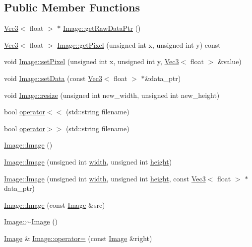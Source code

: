 \subsection*{Public Member Functions}
\begin{DoxyCompactItemize}
\item 
\hyperlink{classmath_1_1_vec3}{Vec3}$<$ float $>$ $\ast$ \hyperlink{classmath_1_1_image_a11850e9ecae1cced03a8ca2ad9469616}{Image\+::get\+Raw\+Data\+Ptr} ()
\item 
\hyperlink{classmath_1_1_vec3}{Vec3}$<$ float $>$ \hyperlink{classmath_1_1_image_ac3df85cc8f60c6f0b2d3de123fa9cf96}{Image\+::get\+Pixel} (unsigned int x, unsigned int y) const
\item 
void \hyperlink{classmath_1_1_image_aa2b37a157ae5f1711b7eaf15b3f6c96a}{Image\+::set\+Pixel} (unsigned int x, unsigned int y, \hyperlink{classmath_1_1_vec3}{Vec3}$<$ float $>$ \&value)
\item 
void \hyperlink{classmath_1_1_image_a6078dd91d77a6753e774466e61afd6f6}{Image\+::set\+Data} (const \hyperlink{classmath_1_1_vec3}{Vec3}$<$ float $>$ $\ast$\&data\+\_\+ptr)
\item 
void \hyperlink{classmath_1_1_image_a3dc725fbfeac02c4687bb7c7e4a184fd}{Image\+::resize} (unsigned int new\+\_\+width, unsigned int new\+\_\+height)
\item 
bool \hyperlink{classmath_1_1_image_a152102a0b98f58cd4bb6206353fb0a4f}{operator$<$$<$} (std\+::string filename)
\item 
bool \hyperlink{classmath_1_1_image_a5a48aa778e407699272463a1be8ac16f}{operator$>$$>$} (std\+::string filename)
\item 
\hyperlink{classmath_1_1_image_a845cd219c6624862cc0c632a8a9efd5f}{Image\+::\+Image} ()
\item 
\hyperlink{classmath_1_1_image_aae37c3657dd8d50277cd9eb9fa15ec7b}{Image\+::\+Image} (unsigned int \hyperlink{classmath_1_1_array_aac107e42abccdfb484b0544e6a860c10}{width}, unsigned int \hyperlink{classmath_1_1_array_a80b79625a8f11cbc63843376b591360c}{height})
\item 
\hyperlink{classmath_1_1_image_a5cccddb81385864de4c9365d3ac95596}{Image\+::\+Image} (unsigned int \hyperlink{classmath_1_1_array_aac107e42abccdfb484b0544e6a860c10}{width}, unsigned int \hyperlink{classmath_1_1_array_a80b79625a8f11cbc63843376b591360c}{height}, const \hyperlink{classmath_1_1_vec3}{Vec3}$<$ float $>$ $\ast$data\+\_\+ptr)
\item 
\hyperlink{classmath_1_1_image_ad58510b279a054e467bf6b4a78c6f75e}{Image\+::\+Image} (const \hyperlink{classmath_1_1_image}{Image} \&src)
\item 
\hyperlink{classmath_1_1_image_a584aa9f6d6f9bd80e94c773402bcf5e2}{Image\+::$\sim$\+Image} ()
\item 
\hyperlink{classmath_1_1_image}{Image} \& \hyperlink{classmath_1_1_image_a0c6305898541b826fa8f5f65333d9072}{Image\+::operator=} (const \hyperlink{classmath_1_1_image}{Image} \&right)
\end{DoxyCompactItemize}
